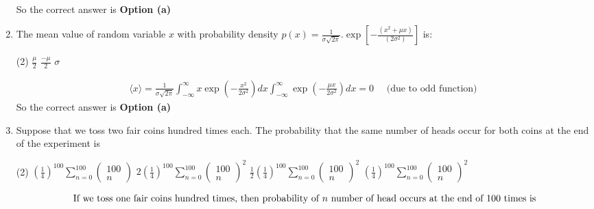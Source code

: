 \begin{enumerate}
\begin{answer}
\begin{align*}
		\end{align*}
			So the correct answer is \textbf{Option (a)}
	\end{answer}
	\item The mean value of random variable $x$ with probability density $p(x)=\frac{1}{\sigma \sqrt{2 \pi}} . \exp \left[-\frac{\left(x^{2}+\mu x\right)}{\left(2 \sigma^{2}\right)}\right]$ is:
	{}
	 \begin{tasks}(2)
		\task[\textbf{b.}]$\frac{\mu}{2}$
		\task[\textbf{c.}] $\frac{-\mu}{2}$
		\task[\textbf{d.}]  $\sigma$
	\end{tasks}
	\begin{answer}
		\begin{align*}
		\langle x\rangle=\frac{1}{\sigma \sqrt{2 \pi}} \int_{-\infty}^{\infty} x \exp \left(-\frac{x^{2}}{2 \sigma^{2}}\right) d x \int_{-\infty}^{\infty} \exp \left(-\frac{\mu x}{2 \sigma^{2}}\right) d x=0 \quad\text{ (due to odd function)}
		\end{align*}
		So the correct answer is \textbf{Option (a)}
	\end{answer}
\item Suppose that we toss two fair coins hundred times each. The probability that the same number of heads occur for both coins at the end of the experiment is
{}
 \begin{tasks}(2)
	\task[\textbf{a.}]$\left(\frac{1}{4}\right)^{100} \sum_{n=0}^{100}\left(\begin{array}{c}100 \\ n\end{array}\right)$
	\task[\textbf{b.}] $2\left(\frac{1}{4}\right)^{100} \sum_{n=0}^{100}\left(\begin{array}{c}100 \\ n\end{array}\right)^{2}$
	\task[\textbf{c.}]$\frac{1}{2}\left(\frac{1}{4}\right)^{100} \sum_{n=0}^{100}\left(\begin{array}{c}100 \\ n\end{array}\right)^{2}$
	\task[\textbf{d.}] $\left(\frac{1}{4}\right)^{100} \sum_{n=0}^{100}\left(\begin{array}{c}100 \\ n\end{array}\right)^{2}$
\end{tasks}
\begin{answer}
	\begin{align*}
	\intertext{ If we toss one fair coins hundred times, then probability of $n$ number of head occurs at the end of 100 times is}

\end{align*}
\end{answer}
\end{enumerate}

